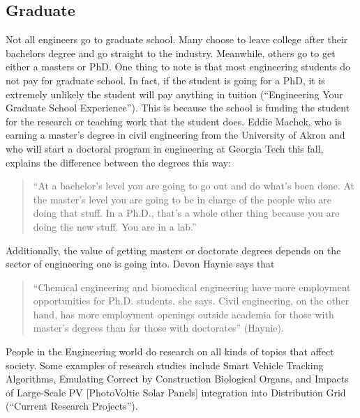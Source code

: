 \begin{multicols}{2}
    \subsection{Graduate}
        Not all engineers go to graduate school. Many choose to leave college after their bachelors degree and go straight to the industry. Meanwhile, others go to get either a masters or PhD. One thing to note is that most engineering students do not pay for graduate school. In fact, if the student is going for a PhD, it is extremely unlikely the student will pay anything in tuition (“Engineering Your Graduate School Experience”). This is because the school is funding the student for the research or teaching work that the student does. Eddie Machek, who is earning a master's degree in civil engineering from the University of Akron and who will start a doctoral program in engineering at Georgia Tech this fall, explains the difference between the degrees this way: 
        \begin{quote}
            “At a bachelor's level you are going to go out and do what's been done. At the master's level you are going to be in charge of the people who are doing that stuff. In a Ph.D., that's a whole other thing because you are doing the new stuff. You are in a lab.” 
        \end{quote}
        Additionally, the value of getting masters or doctorate degrees depends on the sector of engineering one is going into. Devon Haynie says that 
        \begin{quote}
            “Chemical engineering and biomedical engineering have more employment opportunities for Ph.D. students, she says. Civil engineering, on the other hand, has more employment openings outside academia for those with master’s degrees than for those with doctorates” (Haynie).
        \end{quote} 
        People in the Engineering world do research on all kinds of topics that affect society. Some examples of research studies include Smart Vehicle Tracking Algorithms, Emulating Correct by Construction Biological Organs, and Impacts of Large-Scale PV [PhotoVoltic Solar Panels] integration into Distribution Grid (“Current Research Projects”). 

\end{multicols}
